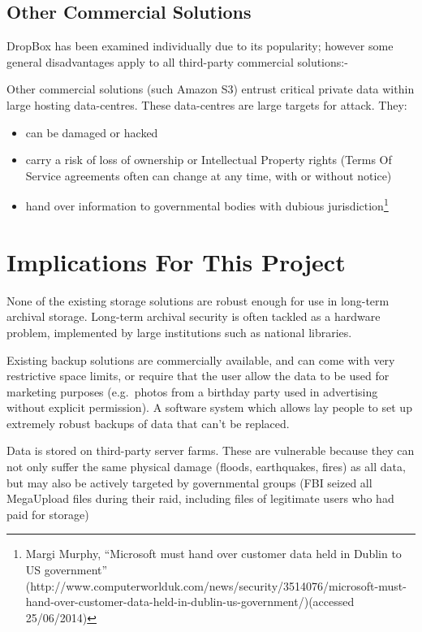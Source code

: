 \documentclass[12pt,a4paper,]{adreport}
\begin{document}
\subsection{Other Commercial
Solutions}\label{other-commercial-solutions}

DropBox has been examined individually due to its popularity; however
some general disadvantages apply to all third-party commercial
solutions:-

Other commercial solutions (such Amazon S3) entrust critical private
data within large hosting data-centres. These data-centres are large
targets for attack. They:

\begin{itemize}
\itemsep1pt\parskip0pt
\item
  can be damaged or hacked
\item
  carry a risk of loss of ownership or Intellectual Property rights
  (Terms Of Service agreements often can change at any time, with or
  without notice)
\item
  hand over information to governmental bodies with dubious
  jurisdiction\footnote{Margi Murphy, ``Microsoft must hand over
    customer data held in Dublin to US government''
    (http://www.computerworlduk.com/news/security/3514076/microsoft-must-hand-over-customer-data-held-in-dublin-us-government/)(accessed
    25/06/2014)}
\end{itemize}

\section{Implications For This
Project}\label{implications-for-this-project}

None of the existing storage solutions are robust enough for use in
long-term archival storage. Long-term archival security is often tackled
as a hardware problem, implemented by large institutions such as
national libraries.

Existing backup solutions are commercially available, and can come with
very restrictive space limits, or require that the user allow the data
to be used for marketing purposes (e.g.~photos from a birthday party
used in advertising without explicit permission). A software system
which allows lay people to set up extremely robust backups of data that
can't be replaced.

Data is stored on third-party server farms. These are vulnerable because
they can not only suffer the same physical damage (floods, earthquakes,
fires) as all data, but may also be actively targeted by governmental
groups (FBI seized all MegaUpload files during their raid, including
files of legitimate users who had paid for storage)
\end{document}

